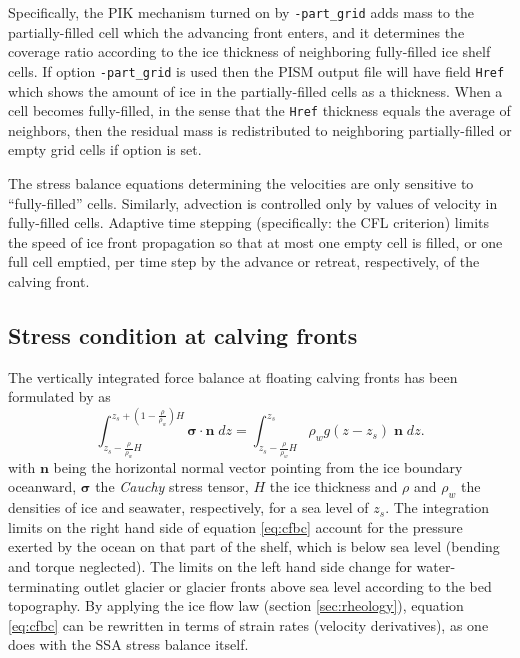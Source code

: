Specifically, the PIK mechanism turned on by \texttt{-part_grid} adds mass to the partially-filled cell which the advancing front enters, and it determines the coverage ratio according to the ice thickness of neighboring fully-filled ice shelf cells.  If option \texttt{-part_grid} is used then the PISM output file will have field \texttt{Href} which shows the amount of ice in the partially-filled cells as a thickness.  When a cell becomes fully-filled, in the sense that the \texttt{Href} thickness equals the average of neighbors, then the residual mass is redistributed to neighboring partially-filled or empty grid cells if option  is set.

The stress balance equations determining the velocities are only sensitive to ``fully-filled'' cells.  Similarly, advection is controlled only by values of velocity in fully-filled cells.  Adaptive time stepping (specifically: the CFL criterion) limits the speed of ice front propagation so that at most one empty cell is filled, or one full cell emptied, per time step by the advance or retreat, respectively, of the calving front.

\subsection{Stress condition at calving fronts}
\label{sec:cfbc}
The vertically integrated force balance at floating calving fronts has been formulated by \cite{Morland} as
\begin{equation}
\int_{z_s-\frac{\rho}{\rho_w}H}^{z_s+(1-\frac{\rho}{\rho_w})H}\mathbf{\sigma}\cdot\mathbf{n}\;dz = \int_{z_s-\frac{\rho}{\rho_w}H}^{z_s}\rho_w g (z-z_s) \;\mathbf{n}\;dz.
\label{eq:cfbc}
\end{equation}
with $\mathbf{n}$ being the horizontal normal vector pointing from the ice boundary oceanward, $\mathbf{\sigma}$ the \emph{Cauchy} stress tensor, $H$ the ice thickness and $\rho$ and $\rho_{w}$ the densities of ice and seawater, respectively, for a sea level of $z_s$. The integration limits on the right hand side of equation \eqref{eq:cfbc} account for the pressure exerted by the ocean on that part of the shelf, which is below sea level (bending and torque neglected). The limits on the left hand side change for water-terminating outlet glacier or glacier fronts above sea level according to the bed topography.  By applying the ice flow law (section \ref{sec:rheology}), equation \eqref{eq:cfbc} can be rewritten in terms of strain rates (velocity derivatives), as one does with the SSA stress balance itself.

